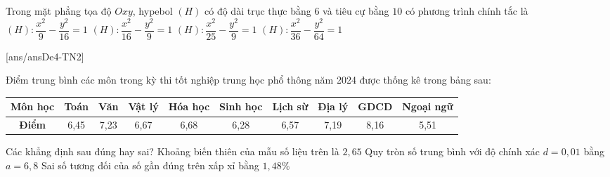 \begin{ex}%
	Trong mặt phẳng tọa độ $Oxy$, hypebol $(H)$ có độ dài trục thực bằng $ 6$ và tiêu cự bằng $ 10$ có phương trình chính tắc là
	\choice
	{\True $(H)\colon\dfrac{x^2}{9}-\dfrac{y^2}{16}=1$}
	{$(H)\colon\dfrac{x^2}{16}-\dfrac{y^2}{9}=1$}
	{$(H)\colon\dfrac{x^2}{25}-\dfrac{y^2}{9}=1$}
	{$(H)\colon\dfrac{x^2}{36}-\dfrac{y^2}{64}=1$}
\end{ex}

\TNTF
{}[ans/ansDe4-TN2]
\begin{ex}%
	Điểm trung bình các môn trong kỳ thi tốt nghiệp trung học phổ thông năm 2024 được thống kê trong bảng sau:
	\begin{center}
		\begin{tabular}{|c|c|c|c|c|c|c|c|c|c|}
			\hline
			\textbf{Môn học} & Toán & Văn  & Vật lý & Hóa học & Sinh học & Lịch sừ & Địa lý & GDCD & Ngoại ngữ \\
			\hline
			\textbf{Điểm}    & 6,45 & 7,23 & 6,67   & 6,68    & 6,28     & 6,57    & 7,19   & 8,16 & 5,51      \\
			\hline
		\end{tabular}
	\end{center}
	Các khẳng định sau đúng hay sai?
	{\True Khoảng biến thiên của mẫu số liệu trên là $2{,}65$}
	{\True Quy tròn số trung bình với độ chính xác $d=0{,}01$ bằng $a=6{,}8$}
	{Sai số tương đối của số gần đúng trên xấp xỉ bằng $1,48\%$}
\end{ex}

